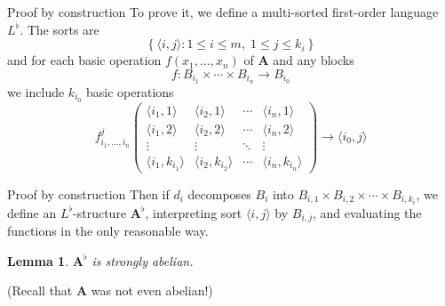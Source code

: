 \documentclass[handout]{beamer}
\newcommand{\alg}[1]{\boldsymbol{#1}}
\newtheorem*{lem}{Lemma}
\begin{document}
\begin{frame}{Proof by construction}
  To prove it, we define a multi-sorted first-order language \(L^\flat\). The sorts are
  \[\left\{ \langle i,j \rangle \colon 1 \leq i \leq m, \; 1 \leq j \leq k_i \right\} \]
  and for each basic operation \(f(x_1, \ldots, x_n)\) of \( \alg{A} \) and any blocks
  \[ f:B_{i_1} \times \cdots \times B_{i_n} \rightarrow B_{i_0} \]
  we include \(k_{i_0}\) basic operations
  \[ f_{i_1, \ldots, i_n}^j
  \begin{pmatrix}
    \langle i_1,1 \rangle & \langle i_2,1 \rangle & \cdots & \langle i_n, 1 \rangle \\
    \langle i_1,2 \rangle & \langle i_2,2 \rangle & \cdots & \langle i_n, 2 \rangle \\
    \vdots & \vdots & \ddots & \vdots \\
    \langle i_1,k_{i_1} \rangle & \langle i_2, k_{i_2} \rangle & \cdots & \langle i_n, k_{i_n} \rangle
  \end{pmatrix} \rightarrow \langle i_0,j \rangle
  \]
\end{frame}

\begin{frame}{Proof by construction}
  Then if \(d_i\) decomposes \( B_i \) into \(B_{i,1} \times B_{i,2} \times \cdots \times B_{i,k_i} \), we define an \(L^\flat\)-structure \( \alg{A}^\flat \), interpreting sort \( \langle i,j \rangle \) by \(B_{i,j} \), and evaluating the functions in the only reasonable way.

  \begin{lem}
    \( \alg{A}^\flat \) is strongly abelian.
  \end{lem}

  (Recall that \( \alg{A} \) was not even abelian!)
\end{frame}
\end{document}
